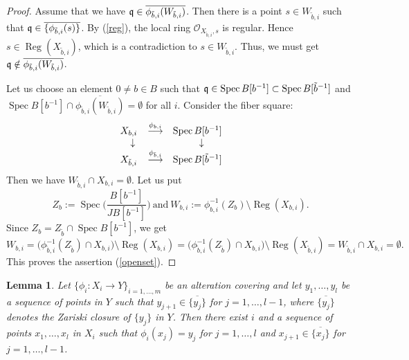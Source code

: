 \documentclass[11pt,a4paper]{amsart}
\newtheorem{lemma}[theorem]{Lemma}
\theoremstyle{definition}
\theoremstyle{remark}
\newcommand{\Spec}{\operatorname{Spec}}
\newcommand{\Reg}{\operatorname{Reg}}
\newcommand{\fq}{\frak{q}}
\begin{document}
\begin{proof}
Assume that we have $\fq \in \overline{\phi_{\tilde{b},i}(W_{\tilde{b},i})}$. Then there is a point $s \in W_{\tilde{b},i}$ such that $\fq \in \overline{\{\phi_{\tilde{b},i}(s)\}}$. By (\ref{reg}), the local ring $\mathcal{O}_{X_{\tilde{b},i},s}$ is regular. Hence $s \in \Reg(X_{\tilde{b},i})$, which is a contradiction to $s \in W_{\tilde{b},i}$. Thus, we must get $\fq \notin \overline{\phi_{\tilde{b},i}(W_{\tilde{b},i})}$. 

Let us choose an element $0 \ne b \in B$ such that $\fq \in \Spec B[b^{-1}] \subset \Spec B[\tilde{b}^{-1}]$ and $\Spec B[b^{-1}] \cap \overline{\phi_{\tilde{b},i}(W_{\tilde{b},i})}=\emptyset$ for all $i$. Consider the fiber square:
\[
\begin{array}{ccccc}
X_{b,i} & \stackrel{\phi_{b,i}}{\longrightarrow} & \Spec B[b^{-1}] &\\
\hphantom{\scriptstyle \psi_i}\downarrow{\scriptstyle} &&  \hphantom{\scriptstyle \psi_i}\downarrow{\scriptstyle}
& & \\
X_{\tilde{b},i} & \stackrel{\phi_{\tilde{b},i}}{\longrightarrow} & \Spec B[\tilde{b}^{-1}]\\
\end{array}
\]
Then we have $W_{\tilde{b},i} \cap X_{b,i}=\emptyset$. Let us put
$$
Z_b:=\Spec \biggl(\frac{B[b^{-1}]}{JB[b^{-1}]}\biggl)~\mbox{and}~W_{b,i}:=\phi^{-1}_{b,i}(Z_b) \setminus \Reg(X_{b,i}).
$$
Since $Z_b=Z_{\tilde{b}} \cap \Spec B[b^{-1}]$, we get
$$
W_{b,i}=\big(\phi^{-1}_{\tilde{b},i}(Z_{\tilde{b}}) \cap X_{b,i}\big) \setminus \Reg(X_{b,i})=\big(\phi^{-1}_{\tilde{b},i}(Z_{\tilde{b}}) \cap X_{b,i}\big) \setminus \Reg(X_{\tilde{b},i})=W_{\tilde{b},i} \cap X_{b,i}=\emptyset.
$$
This proves the assertion (\ref{openset}).
\end{proof}


\begin{lemma}
\label{specialization}
Let $\{ \phi_i :X_i \to Y \}_{i = 1, \ldots, m}$ be an alteration covering and let $y_1,\ldots,y_l$ be a sequence of points in $Y$ such that $y_{j+1} \in \overline{\{y_j\}}$ for $j=1,\ldots,l-1$, where $\overline{\{y_j\}}$ denotes the Zariski closure of $\{ y_j \}$ in $Y$. Then there exist $i$ and a sequence of points $x_1,\ldots,x_l$ in $X_i$ such that $\phi_i(x_j)=y_j$ for $j = 1, \ldots, l$ and $x_{j+1} \in \overline{\{x_j\}}$ for $j=1,\ldots,l-1$.
\end{lemma}
\end{document}
